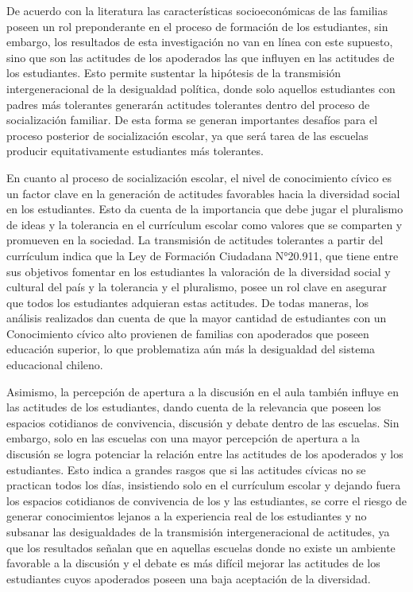 \documentclass[12pt,twoside]{templates/facsothesis}
\begin{document}
De acuerdo con la literatura las características socioeconómicas de las familias poseen un rol preponderante en el proceso de formación de los estudiantes, sin embargo, los resultados de esta investigación no van en línea con este supuesto, sino que son las actitudes de los apoderados las que influyen en las actitudes de los estudiantes. Esto permite sustentar la hipótesis de la transmisión intergeneracional de la desigualdad política, donde solo aquellos estudiantes con padres más tolerantes generarán actitudes tolerantes dentro del proceso de socialización familiar. De esta forma se generan importantes desafíos para el proceso posterior de socialización escolar, ya que será tarea de las escuelas producir equitativamente estudiantes más tolerantes.

En cuanto al proceso de socialización escolar, el nivel de conocimiento cívico es un factor clave en la generación de actitudes favorables hacia la diversidad social en los estudiantes. Esto da cuenta de la importancia que debe jugar el pluralismo de ideas y la tolerancia en el currículum escolar como valores que se comparten y promueven en la sociedad. La transmisión de actitudes tolerantes a partir del currículum indica que la Ley de Formación Ciudadana N°20.911, que tiene entre sus objetivos fomentar en los estudiantes la valoración de la diversidad social y cultural del país y la tolerancia y el pluralismo, posee un rol clave en asegurar que todos los estudiantes adquieran estas actitudes. De todas maneras, los análisis realizados dan cuenta de que la mayor cantidad de estudiantes con un Conocimiento cívico alto provienen de familias con apoderados que poseen educación superior, lo que problematiza aún más la desigualdad del sistema educacional chileno.

Asimismo, la percepción de apertura a la discusión en el aula también influye en las actitudes de los estudiantes, dando cuenta de la relevancia que poseen los espacios cotidianos de convivencia, discusión y debate dentro de las escuelas. Sin embargo, solo en las escuelas con una mayor percepción de apertura a la discusión se logra potenciar la relación entre las actitudes de los apoderados y los estudiantes. Esto indica a grandes rasgos que si las actitudes cívicas no se practican todos los días, insistiendo solo en el currículum escolar y dejando fuera los espacios cotidianos de convivencia de los y las estudiantes, se corre el riesgo de generar conocimientos lejanos a la experiencia real de los estudiantes y no subsanar las desigualdades de la transmisión intergeneracional de actitudes, ya que los resultados señalan que en aquellas escuelas donde no existe un ambiente favorable a la discusión y el debate es más difícil mejorar las actitudes de los estudiantes cuyos apoderados poseen una baja aceptación de la diversidad.
\end{document}
